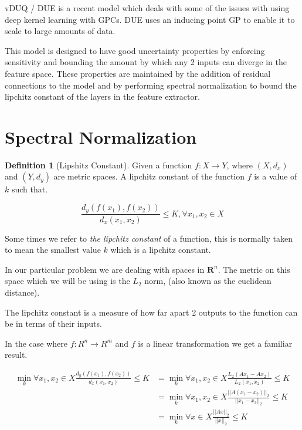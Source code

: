 \documentclass[12pt, a4paper]{report}
\theoremstyle{definition}
\theoremstyle{definition}
\newtheorem{definition}{Definition}[section]
\theoremstyle{definition}
\begin{document}
vDUQ / DUE \cite{vanamersfoort2020uncertainty} is a recent model which deals with some of the issues with using deep kernel learning with GPCs. DUE uses an inducing point GP to enable it to scale to large amounts of data.

This model is designed to have good uncertainty properties by enforcing sensitivity and bounding the amount by which any 2 inputs can diverge in the feature space. These properties are maintained by the addition of residual connections to the model and by performing spectral normalization to bound the lipchitz constant of the layers in the feature extractor.

\section{Spectral Normalization}

\begin{definition}[Lipshitz Constant]
    Given a function $f: X \rightarrow Y$, where $(X, d_x)$ and $(Y, d_y)$ are metric spaces. A lipchitz constant of the function $f$ is a value of $k$ such that.

    $$\frac{d_y(f(x_1), f(x_2))}{d_x(x_1, x_2)} \leq K, \forall x_1, x_2 \in X $$
\end{definition}

Some times we refer to \textit{the lipchitz constant} of a function, this is normally taken to mean the smallest value $k$ which is a lipchitz constant.

In our particular problem we are dealing with spaces in $\mathbf{R}^n$. The metric on this space which we will be using is the $L_2$ norm, (also known as the euclidean distance).

The lipchitz constant is a measure of how far apart 2 outputs to the function can be in terms of their inputs.

In the case where $f: R^n \rightarrow R^m$ and $f$ is a linear transformation we get a familiar result.

\begin{align*}
    \min_k  \forall x_1,x_2 \in X \frac{d_y(f(x_1), f(x_2))}{d_x(x_1, x_2)} \leq K &= \min_k \forall x_1,x_2 \in X \frac{ L_2(Ax_1 - Ax_2)  }{ L_2(x_1, x_2)} \leq K \\
    &=  \min_k \forall x_1,x_2 \in X  \frac{ ||A(x_1 - x_2)||_2  }{ ||x_1- x_2||_2 } \leq K \\
    &=  \min_k \forall x \in X  \frac{ ||Ax||_2  }{ ||x||_2 } \leq K \\
\end{align*}
\end{document}
